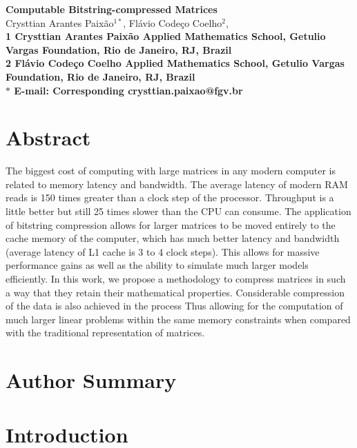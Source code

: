 \documentclass[10pt]{article}
\date{}
\begin{document}
\begin{flushleft}
{\Large
\textbf{Computable Bitstring-compressed Matrices}
}
\\
Crysttian Arantes Paix\~{a}o$^{1\ast}$, 
Fl\'{a}vio Code\c{c}o Coelho$^{2}$, 
\\
\bf{1} Crysttian Arantes Paix\~{a}o Applied Mathematics School, Getulio Vargas Foundation, Rio de Janeiro, RJ, Brazil
\\
\bf{2} Fl\'{a}vio Code\c{c}o Coelho Applied Mathematics School, Getulio Vargas Foundation, Rio de Janeiro, RJ, Brazil
\\
$\ast$ E-mail: Corresponding crysttian.paixao@fgv.br
\end{flushleft}

\section*{Abstract}
The biggest cost of
computing with large matrices in any modern computer is related to memory
latency and bandwidth. The average latency of modern RAM reads is 150 times
greater than a clock step of the processor\cite{alted2010modern}. Throughput is
a little better but still 25 times slower than the CPU can consume. The
application of bitstring compression allows for larger matrices to be moved
entirely to the cache memory of the computer, which has much better latency and
bandwidth (average latency of L1 cache is 3 to 4 clock steps). This allows for
massive performance gains as well as the ability to simulate much larger models
efficiently. In this work, we propose a methodology to compress matrices in such
a way that they retain their mathematical properties. Considerable compression
of the data is also achieved in the process Thus allowing for the computation of
much larger linear problems within the same memory constraints when compared
with the traditional representation of matrices.

\section*{Author Summary}

\section*{Introduction}
\end{document}
